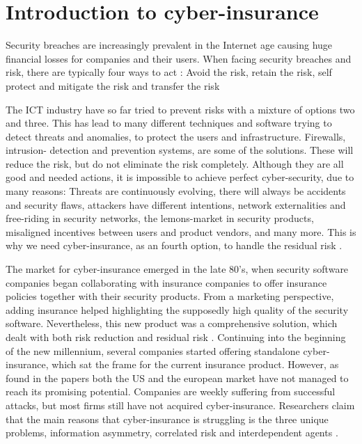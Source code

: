 \section{Introduction to cyber-insurance}
Security breaches are increasingly prevalent in the Internet age causing huge financial losses
for companies and their users. When facing security breaches and risk, there are typically four ways to act \cite{bolot:cyber}:
Avoid the risk, retain the risk, self protect and mitigate the risk and transfer the risk

The ICT industry have so far tried to prevent risks with a mixture of options two and three. This has lead to many different techniques and software trying to detect threats and anomalies, to protect the users and infrastructure. Firewalls, intrusion- detection and prevention systems, are some of the solutions. These will reduce the risk, but do not eliminate the risk completely. Although they are all good and needed actions, it is impossible to achieve perfect cyber-security, due to many reasons: Threats are continuously evolving, there will always be accidents and security flaws, attackers have different intentions, network externalities and free-riding in security networks, the lemons-market in security products, misaligned incentives between users and product vendors, and many more. 
This is why we need cyber-insurance, as an fourth option, to handle the residual risk \cite{bolot:cyber2,ranjan:cyber}.

The market for cyber-insurance emerged in the late 80's, when security software companies began collaborating with insurance companies to offer insurance policies together with their security products. From a marketing perspective, adding insurance helped highlighting the supposedly high quality of the security software. Nevertheless, this new product was a comprehensive solution, which dealt with both risk reduction and residual risk \cite{bolot:new}. Continuing into the beginning of the new millennium, several companies started offering standalone cyber-insurance, which sat the frame for the current insurance product. However, as found in the papers \cite{ccost,evolvingcyber,CFCunder} both the US and the european market have not managed to reach its promising potential. Companies are weekly suffering from successful attacks, but most firms still have not acquired cyber-insurance. 
Researchers claim that the main reasons that cyber-insurance is struggling is the three unique problems, information asymmetry, correlated risk and interdependent agents \cite{bohme2010modeling}. 
